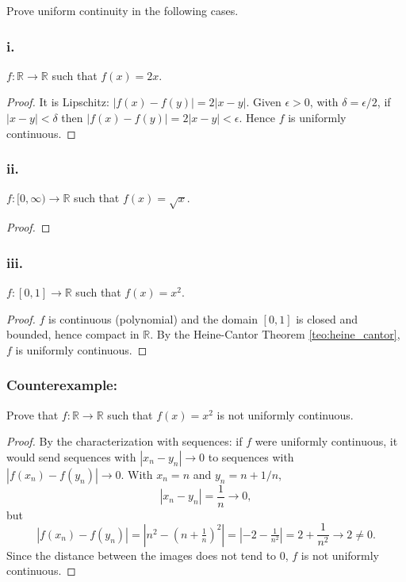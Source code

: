 \documentclass[11pt, a4paper]{article}
\begin{document}
Prove uniform continuity in the following cases.

\subsubsection*{i.}
$f: \mathbb{R} \to \mathbb{R}$ such that $f(x) = 2x$.

\begin{proof}
It is Lipschitz: $|f(x) - f(y)| = 2|x - y|$. Given $\epsilon > 0$, with $\delta = \epsilon/2$, if
$|x - y| < \delta$ then $|f(x) - f(y)| = 2|x - y| < \epsilon$. Hence $f$ is uniformly
continuous.
\end{proof}

\subsubsection*{ii.}
$f: [0, \infty) \to \mathbb{R}$ such that $f(x) = \sqrt{x}$.

\begin{proof}
\end{proof}

\subsubsection*{iii.}
$f: [0, 1] \to \mathbb{R}$ such that $f(x) = x^2$.

\begin{proof}
$f$ is continuous (polynomial) and the domain $[0, 1]$ is closed and bounded, hence compact in
$\mathbb{R}$. By the Heine-Cantor Theorem \ref{teo:heine_cantor}, $f$ is uniformly continuous.
\end{proof}

\subsubsection*{Counterexample:}
Prove that $f: \mathbb{R} \to \mathbb{R}$ such that $f(x) = x^2$ is not uniformly continuous.

\begin{proof}
By the characterization with sequences: if $f$ were uniformly continuous, it would send sequences with
$|x_n - y_n| \to 0$ to sequences with $|f(x_n) - f(y_n)| \to 0$. With $x_n = n$ and $y_n = n + 1/n$,
$$ |x_n - y_n| = \frac{1}{n} \to 0, $$
but
$$ |f(x_n) - f(y_n)| = \left| n^2 - \left(n + \tfrac{1}{n}\right)^2 \right|
= \left| -2 - \tfrac{1}{n^2} \right| = 2 + \frac{1}{n^2} \to 2 \neq 0. $$
Since the distance between the images does not tend to $0$, $f$ is not uniformly continuous.
\end{proof}
\end{document}
